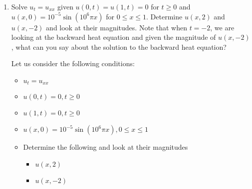 \documentclass{article}
\begin{document}
\begin{enumerate}
%
%
\newpage
%
%
  \item Solve $u_t = u_{xx}$ given $u(0, t) = u(1, t) = 0$ for $t \geq 0$ and $u(x, 0) = 10^{-5} \sin(10^6 \pi x)$ for $0 \leq x \leq 1$. Determine $u(x, 2)$ and $u(x, -2)$ and look at their magnitudes. Note that when $t = -2$, we are looking at the backward heat equation and given the magnitude of $u(x, -2)$, what can you say about the solution to the backward heat equation?

  Let us consider the following conditions:
  \begin{itemize}
    \item $u_t = u_{xx}$
    \item $u(0, t) = 0, t \geq 0$
    \item $u(1, t) = 0, t \geq 0$
    \item $u(x, 0) = 10^{-5} \sin(10^6 \pi x), 0 \leq x \leq 1$
    \item Determine the following and look at their magnitudes
    \begin{itemize}
      \item $u(x, 2)$
      \item $u(x, -2)$
    \end{itemize}
  \end{itemize}
\end{enumerate}
\end{document}
